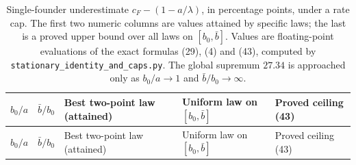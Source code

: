 \documentclass[
  british,
  11pt,
  a4paper,
]{article}
\begin{document}
\begin{longtable}[]{@{}
  >{\raggedleft\arraybackslash}p{}
  >{\raggedleft\arraybackslash}p{}
  >{\raggedleft\arraybackslash}p{}
  >{\raggedleft\arraybackslash}p{}
  >{\raggedleft\arraybackslash}p{}@{}}
\caption{Single-founder underestimate \(c_F-(1-a/\lambda)\), in
percentage points, under a rate cap. The first two numeric columns are
values attained by specific laws; the last is a proved upper bound over
all laws on \([b_0,\bar b]\). Values are floating-point evaluations of
the exact formulas (29), (4) and (43), computed by
\protect\texttt{stationary\_identity\_and\_caps.py}. The global supremum
\(27.34\) is approached only as \(b_0/a\to1\) and
\(\bar b/b_0\to\infty\).}\tabularnewline
\toprule\noalign{}
\begin{minipage}[b]{\linewidth}\raggedleft
\(b_0/a\)
\end{minipage} & \begin{minipage}[b]{\linewidth}\raggedleft
\(\bar b/b_0\)
\end{minipage} & \begin{minipage}[b]{\linewidth}\raggedleft
Best two-point law (attained)
\end{minipage} & \begin{minipage}[b]{\linewidth}\raggedleft
Uniform law on \([b_0,\bar b]\)
\end{minipage} & \begin{minipage}[b]{\linewidth}\raggedleft
Proved ceiling (43)
\end{minipage} \\
\midrule\noalign{}
\endfirsthead
\toprule\noalign{}
\begin{minipage}[b]{\linewidth}\raggedleft
\(b_0/a\)
\end{minipage} & \begin{minipage}[b]{\linewidth}\raggedleft
\(\bar b/b_0\)
\end{minipage} & \begin{minipage}[b]{\linewidth}\raggedleft
Best two-point law (attained)
\end{minipage} & \begin{minipage}[b]{\linewidth}\raggedleft
Uniform law on \([b_0,\bar b]\)
\end{minipage} & \begin{minipage}[b]{\linewidth}\raggedleft
Proved ceiling (43)

\end{minipage}
\end{longtable}
\end{document}
